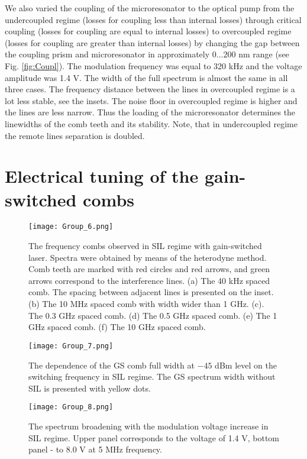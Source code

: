 \documentclass[a4paper, amsfonts, amssymb, amsmath, reprint, showkeys, nofootinbib, twoside,longbibliography, aps]{revtex4-1}
\begin{document}
We also varied the coupling of the microresonator to the optical pump from the undercoupled regime (losses for coupling less than internal losses) through critical coupling (losses for coupling are equal to internal losses) to overcoupled regime (losses for coupling are greater than internal losses) by changing the gap between the coupling prism and microresonator in approximately $0...200$ nm range (see Fig. \ref{fig:Coupl}). The modulation frequency was equal to 320 kHz and the voltage amplitude was 1.4 V. The width of the full spectrum is almost the same in all three cases. The frequency distance between the lines in overcoupled regime is a lot less stable, see the insets. The noise floor in overcoupled regime is higher and the lines are less narrow. Thus the loading of the microresonator determines the linewidths of the comb teeth and its stability. Note, that in undercoupled regime the remote lines separation is doubled.






\section{Electrical tuning of the gain-switched combs}


\begin{figure*}[hbtp!]
\centering
\texttt{[image: Group\_6.png]}
\caption{The frequency combs observed in SIL regime with gain-switched laser. Spectra were obtained by means of the heterodyne method. Comb teeth are marked with red circles and red arrows, and green arrows correspond to the interference lines. (a) The 40 kHz spaced comb. The spacing between adjacent lines is presented on the inset. (b) The 10 MHz spaced comb with width wider than 1 GHz. (c). The 0.3 GHz spaced comb. (d) The 0.5 GHz spaced comb. (e) The 1 GHz spaced comb. (f) The 10 GHz spaced comb. 
}
\label{fig:SIL}
\end{figure*}

\begin{figure}[hbtp!]
\centering
\texttt{[image: Group\_7.png]}
\caption{ The dependence of the GS comb full width at $-45$ dBm level on the switching frequency in SIL regime. The GS spectrum width without SIL is presented with yellow dots.
}
\label{fig:CombWidth}
\end{figure}

\begin{figure}[hbtp!]
\centering
\texttt{[image: Group\_8.png]}
\caption{ The spectrum broadening with the modulation voltage increase in SIL regime. Upper panel corresponds to the voltage of 1.4 V, bottom panel - to 8.0 V at 5 MHz frequency.  }
\label{fig:Electrically_tuned}
\end{figure}
\end{document}
